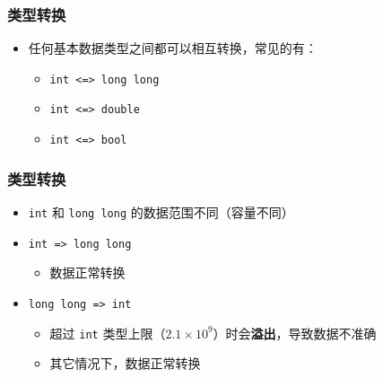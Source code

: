 \begin{frame}[fragile]
    \frametitle{类型转换}

    \begin{itemize}
        \item 任何基本数据类型之间都可以相互转换，常见的有：

            \begin{itemize}
                \item \lstinline|int <=> long long|
                \item \lstinline|int <=> double|
                \item \lstinline|int <=> bool|
            \end{itemize}

    \end{itemize}
\end{frame}

\begin{frame}[fragile]
    \frametitle{类型转换}

    \begin{itemize}
        \item<1-> \lstinline|int| 和 \lstinline|long long| 的数据范围不同（容量不同）

        \item<2-> \lstinline|int => long long|

            \begin{itemize}
                \item 数据正常转换
            \end{itemize}

        \item<3-> \lstinline|long long => int|

            \begin{itemize}
                \item 超过 \lstinline|int| 类型上限（$2.1 \times 10^9$）时会\textbf{溢出}，导致数据不准确
                \item 其它情况下，数据正常转换
            \end{itemize}

    \end{itemize}
\end{frame}

